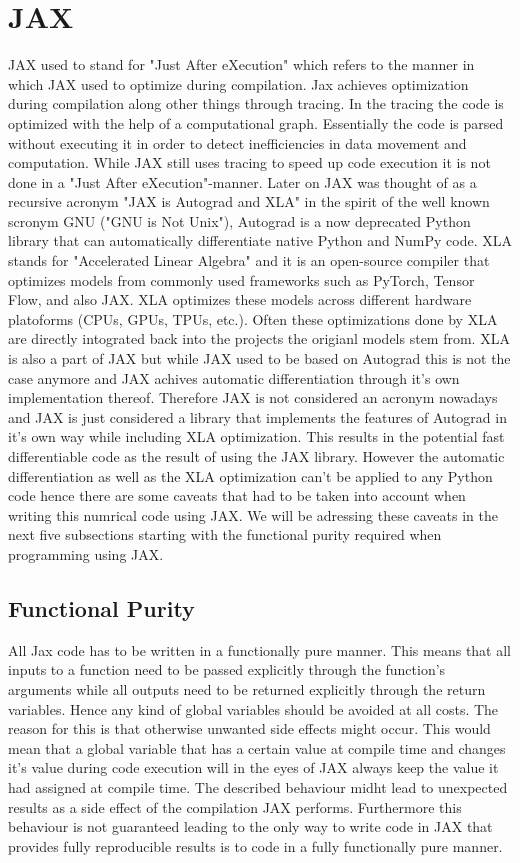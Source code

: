 \documentclass[a4paper, oneside]{discothesis}
\begin{document}
\section{JAX} \label{sec:jax}
JAX used to stand for "Just After eXecution" which refers to the manner in which JAX used to optimize during compilation.
Jax achieves optimization during compilation along other things through tracing.
In the tracing the code is optimized with the help of a computational graph.
Essentially the code is parsed without executing it in order to detect inefficiencies in data movement and computation.
While JAX still uses tracing to speed up code execution it is not done in a "Just After eXecution"-manner.
Later on JAX was thought of as a recursive acronym "JAX is Autograd and XLA" in the spirit of the well known scronym GNU ("GNU is Not Unix"),
Autograd is a now deprecated Python library that can automatically differentiate native Python and NumPy code.
XLA stands for "Accelerated Linear Algebra" and it is an open-source compiler that optimizes models from commonly used frameworks such as PyTorch, Tensor Flow, and also JAX.
XLA optimizes these models across different hardware platoforms (CPUs, GPUs, TPUs, etc.).
Often these optimizations done by XLA are directly intograted back into the projects the origianl models stem from.
XLA is also a part of JAX but while JAX used to be based on Autograd this is not the case anymore and JAX achives automatic differentiation through it's own implementation thereof.
Therefore JAX is not considered an acronym nowadays and JAX is just considered a library that implements the features of Autograd in it's own way while including XLA optimization.
This results in the potential fast differentiable code as the result of using the JAX library.
However the automatic differentiation as well as the XLA optimization can't be applied to any Python code hence there are some caveats that had to be taken into account when writing this numrical code using JAX.
We will be adressing these caveats in the next five subsections starting with the functional purity required when programming using JAX.

\subsection{Functional Purity}
All Jax code has to be written in a functionally pure manner.
This means that all inputs to a function need to be passed explicitly through the function's arguments while all outputs need to be returned explicitly through the return variables.
Hence any kind of global variables should be avoided at all costs.
The reason for this is that otherwise unwanted side effects might occur.
This would mean that a global variable that has a certain value at compile time and changes it's value during code execution will in the eyes of JAX always keep the value it had assigned at compile time.
The described behaviour midht lead to unexpected results as a side effect of the compilation JAX performs.
Furthermore this behaviour is not guaranteed leading to the only way to write code in JAX that provides fully reproducible results is to code in a fully functionally pure manner.
\end{document}
